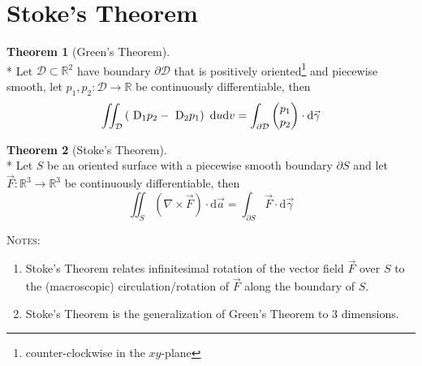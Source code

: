 \documentclass[10pt,a4paper]{report}
\theoremstyle{definition}
\newtheorem{theorem}{Theorem}[chapter]
\theoremstyle{plain}
\theoremstyle{definition}
\theoremstyle{plain}
\newcommand{\dd}{\mathop{}\,\mathrm{d}}
\newcommand{\DD}{\mathop{}\,\mathrm{D}}
\newcommand{\ddns}{\mathrm{d}}
\newenvironment{colvectorenvironment}{\left(\!\!\!\begin{array}{c}}{\end{array}\!\!\!\right)}
\newenvironment{notes}{\textsc{Notes:}\begin{enumerate}[1)]}{\end{enumerate}}
\newcommand{\real}{\mathbb{R}}
\newcommand{\domain}{\mathcal{D}}
\newcommand{\curl}[1]{\nabla\!\times\!#1}
\begin{document}
\section{Stoke's Theorem}

\begin{theorem}[Green's Theorem]\label{thm:1-1}\ \\*
    Let $\domain \subset \real^2$ have boundary $\partial\domain$ that is positively oriented\footnote{counter-clockwise in the $xy$-plane}
    and piecewise smooth, let $p_1,p_2\colon\domain\to\real$ be continuously differentiable, then
    \[
        \iint_\domain \left( \DD_1p_2 - \DD_2p_1 \right) \dd u\ddns v
        = \int_{\partial\domain}\begin{colvectorenvironment}p_1\\p_2\end{colvectorenvironment} \cdot \ddns\vec{\gamma}
    \]
\end{theorem}

\begin{theorem}[Stoke's Theorem]\label{thm:1-2}\ \\*
    Let $S$ be an oriented surface with a piecewise smooth boundary $\partial S$ and let $\vec{F}\colon \real^3\to\real^3$ be continuously
    differentiable, then
    \[
        \iint_S \left( \curl{\vec{F}} \right) \cdot \ddns\vec{a} = \int_{\partial S}\vec{F}\cdot\ddns\vec{\gamma}
    \]

    \begin{notes}
        \item
            Stoke's Theorem relates infinitesimal rotation of the vector field $\vec{F}$ over $S$ to the (macroscopic) circulation/rotation
            of $\vec{F}$ along the boundary of $S$.
        \item
            Stoke's Theorem is the generalization of Green's Theorem to 3 dimensions.
    \end{notes}
\end{theorem}
\end{document}
